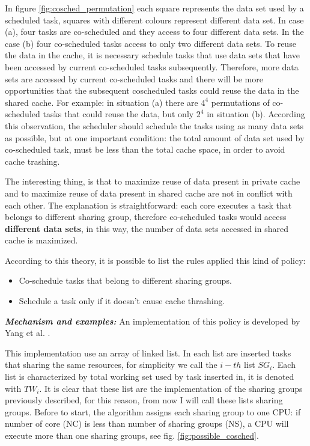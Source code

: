 \begin{description}
In figure \ref{fig:cosched_permutation} each square represents the data set used by a scheduled task, squares with different colours represent different 
data set. In case (a), four tasks are co-scheduled and they access to four different data sets. In the case (b) four co-scheduled tasks access to only two 
different data sets. To reuse the data in the cache, it is necessary schedule tasks that use data sets that have been accessed by current co-scheduled 
tasks subsequently. Therefore, more data sets are accessed by current co-scheduled tasks and there will be more opportunities that the subsequent 
coscheduled tasks could reuse the data in the shared cache. For example: in situation (a) there are $4^4$ permutations of co-scheduled tasks that could 
reuse the data, but only $2^4$ in situation (b). According this observation, the scheduler should schedule the tasks using as many data sets as possible, 
but at one important condition: the total amount of data set used by co-scheduled task, must be less than the total cache space, in order to avoid cache 
trashing.

The interesting thing, is that to maximize reuse of data present in private cache and to maximize reuse of data present in shared cache are not in conflict
with each other. The explanation is straightforward: each core executes a task that belongs to different sharing group, therefore co-scheduled tasks would 
access \textbf{different data sets}, in this way, the number of data sets accessed in shared cache is maximized.

According to this theory, it is possible to list the rules applied this kind of policy:

\begin{itemize}
	\item Co-schedule tasks that belong to different sharing groups. 
	\item Schedule a task only if it doesn't cause cache thrashing.
\end{itemize}

\textit{\textbf{Mechanism and examples:}} An implementation of this policy is developed by Yang et al. \cite{taiwan}. 

This implementation use an array of linked list. In each list are inserted tasks that sharing the same resources, for simplicity we call the $i-th$ list 
$SG_i$. Each list is characterized by total working set used by task inserted in, it is denoted with $TW_i$. It is clear that these list are the 
implementation of the sharing groups previously described, for this reason, from now I will call these lists sharing groups. Before to start, the algorithm 
assigns each sharing group to one CPU: if number of core (NC) is less than
number of sharing groups (NS), a CPU will execute more than one sharing groups, 
see fig. \ref{fig:possible_cosched}.


\end{description}
